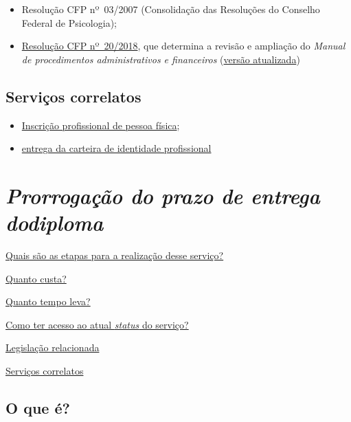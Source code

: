 \begin{itemize}
  \item  Resolução CFP nº~03/2007 (Consolidação das Resoluções do Conselho  Federal de Psicologia);
  \item  \href{https://transparencia.cfp.org.br/wp-content/uploads/sites/7/2020/05/Manual-de-Procedimentos-Administrativos-e-Financeiro-CFP-RES-20.2018.pdf}{\href{https://atosoficiais.com.br/cfp/resolucao-administrativa-financeira-n-20-2018-altera-o-manual-de-procedimentos-administrativo-e-financeiro-do-sistema-conselhos-de-psicologia-anexo-da-resolucao-cfp-n-202018-a-resolucao-cfp-n-03-2007-a-resolucao-cfp-n-16-2019-e-da-outras-providencias}{Resolução  CFP nº~20/2018}}, que determina a revisão e ampliação do \emph{Manual  de procedimentos administrativos e financeiros}  (\href{https://transparencia.cfp.org.br/wp-content/uploads/sites/7/2020/05/Manual-de-Procedimentos-Administrativos-e-Financeiro-CFP-RES-20.2018.pdf}{versão  atualizada})
\end{itemize}

\section{Serviços correlatos}

\begin{itemize}
  \item  \hyperref[]{Inscrição  profissional de pessoa física};
  \item  \hyperref[]{entrega  da carteira de identidade profissional}
\end{itemize}

\chapter{\texorpdfstring{\emph{Prorrogação do prazo de entrega dodiploma}}{Prorrogação do prazo de entrega do diploma}}
\hyperref[]{Quais são as etapas para a realização desse serviço?}

\hyperref[]{Quanto custa?}

\hyperref[]{Quanto tempo leva?}

\hyperref[]{Como ter acesso ao atual \emph{status} do serviço?}

\hyperref[]{Legislação relacionada}

\hyperref[]{Serviços correlatos}

\section{O que é?}

